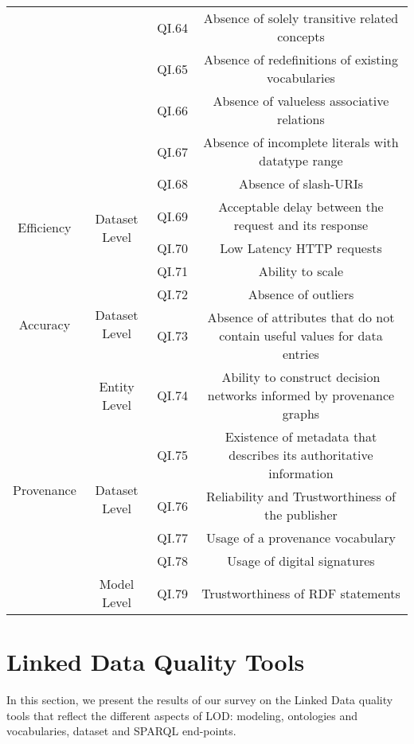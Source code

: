 \documentclass[onecolumn, crcready]{iosart2c}
\begin{document}
\begin{landscape}
\begin{center}
{\begin{longtable}[h]{|c|c|c|c|}
\cline{3-4}
 &  & QI.64 & Absence of solely transitive related concepts \cite{Mader2012}\tabularnewline
\cline{3-4}
 &  & QI.65 & Absence of redefinitions of existing vocabularies  \cite{Hogan2010}\tabularnewline
\cline{3-4}
 &  & QI.66 & Absence of valueless associative relations  \cite{Mader2012}\tabularnewline
\cline{3-4}
 &  & QI.67 & Absence of incomplete literals with datatype range \cite{Hogan2010}\tabularnewline
\hline
\hline
\multirow{4}{*}{Efficiency} & \multirow{4}{*}{Dataset Level} & QI.68 & Absence of slash-URIs \cite{Framework2012}\tabularnewline
\cline{3-4}
 &  & QI.69 & Acceptable delay between the request and its response \cite{citeulike:2925559}\tabularnewline
\cline{3-4}
 &  & QI.70 & Low Latency HTTP requests \cite{Framework2012}\tabularnewline
\cline{3-4}
 &  & QI.71 & Ability to scale \cite{Framework2012}\tabularnewline
\hline
\hline
\multirow{2}{*}{Accuracy} & \multirow{2}{*}{Dataset Level} & QI.72 & Absence of outliers \cite{Framework2012}\tabularnewline
\cline{3-4}
 &  & QI.73 & Absence of attributes that do not contain useful values for data entries \cite{Framework2012}\tabularnewline
\hline
\hline
\multirow{6}{*}{Provenance} & \multirow{1}{*}{Entity Level} & QI.74 & Ability to construct decision networks informed by provenance graphs \cite{Gamble2011}\tabularnewline
\cline{2-4}
 & \multirow{4}{*}{Dataset Level} & QI.75 & Existence of metadata that describes its authoritative information  \cite{Flouris2012}\tabularnewline
\cline{3-4}
 &  & QI.76 & Reliability and Trustworthiness of the publisher \cite{Flouris2012}\tabularnewline
\cline{3-4}
 &  & QI.77 & Usage of a provenance vocabulary\tabularnewline
\cline{3-4}
 &  & QI.78 & Usage of digital signatures \cite{Framework2012}\tabularnewline
\cline{2-4}
 & \multirow{1}{*}{Model Level} & QI.79 & Trustworthiness of RDF statements \cite{Hartig09usingweb}\tabularnewline
\hline
\end{longtable}
}
\end{center}
\end{landscape}

\section{Linked Data Quality Tools}
In this section, we present the results of our survey on the Linked Data quality tools that reflect the different aspects of LOD: modeling, ontologies and vocabularies, dataset and SPARQL end-points.\\
\end{document}
